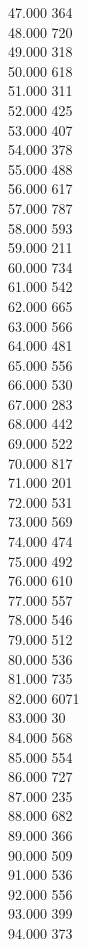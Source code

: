 { 47.000	364 \\
 48.000	720 \\
 49.000	318 \\
 50.000	618 \\
 51.000	311 \\
 52.000	425 \\
 53.000	407 \\
 54.000	378 \\
 55.000	488 \\
 56.000	617 \\
 57.000	787 \\
 58.000	593 \\
 59.000	211 \\
 60.000	734 \\
 61.000	542 \\
 62.000	665 \\
 63.000	566 \\
 64.000	481 \\
 65.000	556 \\
 66.000	530 \\
 67.000	283 \\
 68.000	442 \\
 69.000	522 \\
 70.000	817 \\
 71.000	201 \\
 72.000	531 \\
 73.000	569 \\
 74.000	474 \\
 75.000	492 \\
 76.000	610 \\
 77.000	557 \\
 78.000	546 \\
 79.000	512 \\
 80.000	536 \\
 81.000	735 \\
 82.000	6071 \\
 83.000	30 \\
 84.000	568 \\
 85.000	554 \\
 86.000	727 \\
 87.000	235 \\
 88.000	682 \\
 89.000	366 \\
 90.000	509 \\
 91.000	536 \\
 92.000	556 \\
 93.000	399 \\
 94.000	373 \\
}
